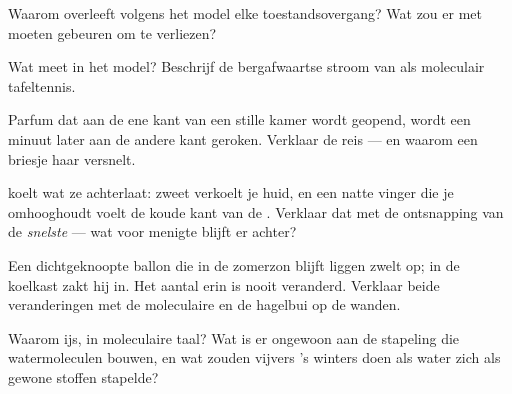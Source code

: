 \begin{exercise}[$\star$]\label{exo:g7:states-of-matter:6}
Waarom overleeft  volgens het model elke toestandsovergang? Wat
zou er met  moeten gebeuren om  te verliezen?
\end{exercise}

\begin{exercise}[$\star$]\label{exo:g7:states-of-matter:7}
Wat meet  in het model? Beschrijf de bergafwaartse
stroom van  als moleculair tafeltennis.
\end{exercise}

\begin{exercise}[$\star$]\label{exo:g7:states-of-matter:8}
Parfum dat aan de ene kant van een stille kamer wordt geopend, wordt
een minuut later aan de andere kant geroken. Verklaar de reis --- en
waarom een briesje haar versnelt.
\end{exercise}

\begin{exercise}[$\star\star$]\label{exo:g7:states-of-matter:9}
 koelt wat ze achterlaat: zweet verkoelt je huid, en een
natte vinger die je omhooghoudt voelt de koude kant van de
. Verklaar dat met de ontsnapping van de \emph{snelste}
 --- wat voor menigte blijft er achter?
\end{exercise}

\begin{exercise}[$\star\star$]\label{exo:g7:states-of-matter:10}
Een dichtgeknoopte ballon die in de zomerzon blijft liggen zwelt op; in
de koelkast zakt hij in. Het aantal  erin is nooit
veranderd. Verklaar beide veranderingen met de moleculaire
 en de hagelbui op de wanden.
\end{exercise}

\begin{exercise}[$\star\star$]\label{exo:g7:states-of-matter:11}
Waarom  ijs, in moleculaire taal? Wat is er ongewoon aan de
stapeling die watermoleculen bouwen, en wat zouden vijvers 's winters
doen als water zich als gewone stoffen stapelde?
\end{exercise}

